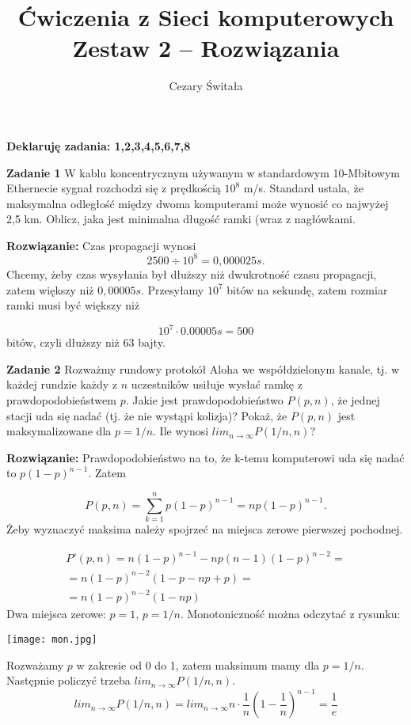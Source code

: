 \documentclass[12pt,a4paper]{article}
\title{Ćwiczenia z Sieci komputerowych \\ Zestaw 2 -- Rozwiązania}
\author{Cezary Świtała}
\begin{document}
\maketitle

\vskip 0.2cm
\noindent
\textbf{Deklaruję zadania: 1,2,3,4,5,6,7,8}
\vskip 0.2cm


\noindent
\textbf{Zadanie 1} W kablu koncentrycznym używanym w standardowym 10-Mbitowym Ethernecie sygnał rozchodzi się z prędkością \(10^8\) m/s. Standard ustala, że maksymalna odległość między dwoma komputerami może wynosić co najwyżej 2,5 km. Oblicz, jaka jest minimalna długość ramki (wraz z nagłówkami.

\vskip5pt
\noindent
\textbf{Rozwiązanie:}
Czas propagacji wynosi 
\[ 2500 \div 10^8 = 0,000025s.\]
Chcemy, żeby czas wysyłania był dłuższy niż dwukrotność czasu propagacji, zatem większy niż \(0,00005s\). Przesyłamy \(10^7\) bitów na sekundę, zatem rozmiar ramki musi być większy niż 

\[
10^7 \cdot 0.00005s = 500
\]
bitów, czyli dłuższy niż 63 bajty.

\vskip10pt

\noindent
\textbf{Zadanie 2} Rozważmy rundowy protokół Aloha we współdzielonym kanale, tj. w każdej rundzie każdy z \(n\) uczestników usiłuje wysłać ramkę z prawdopodobieństwem \(p\). Jakie jest prawdopodobieństwo \(P(p,n)\), że jednej stacji uda się nadać (tj. że nie wystąpi kolizja)? Pokaż, że \(P(p,n)\) jest maksymalizowane dla \(p=1/n\). Ile wynosi \(lim_{n \rightarrow \infty} P(1/n, n)\)?

\vskip5pt

\noindent
\textbf{Rozwiązanie:} Prawdopodobieństwo na to, że k-temu komputerowi uda się nadać to \(p(1-p)^{n-1}\). Zatem

\[
P(p,n) = \sum_{k=1}^{n} p(1-p)^{n-1} = np(1-p)^{n-1}.
\]
Żeby wyznaczyć maksima należy spojrzeć na miejsca zerowe pierwszej pochodnej.

\begin{gather*}
P'(p,n) = n(1-p)^{n-1} - np(n-1)(1-p)^{n-2} = \\
= n(1-p)^{n-2}( 1 - p - np + p ) = \\
= n(1-p)^{n-2}( 1 - np )
\end{gather*}
\newpage
\noindent
Dwa miejsca zerowe: \(p = 1\), \(p = 1/n\). Monotoniczność można odczytać z rysunku:

\begin{center}
	\texttt{[image: mon.jpg]}
\end{center}
Rozważamy \(p\) w zakresie od 0 do 1, zatem maksimum mamy dla \(p=1/n\). Następnie policzyć trzeba \(lim_{n \rightarrow \infty} P(1/n, n)\).
\[
 lim_{n \rightarrow \infty} P(1/n, n) = lim_{n \rightarrow \infty} n \cdot \frac{1}{n} \left( 1-\frac{1}{n} \right) ^{n - 1} = \frac{1}{e}
\]
\end{document}
